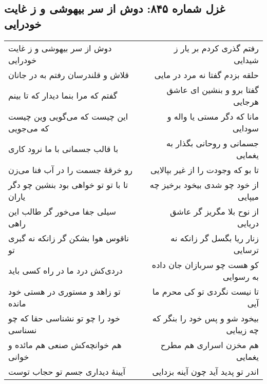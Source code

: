 \begin{center}
\section*{غزل شماره ۸۴۵: دوش از سر بیهوشی و ز غایت خودرایی}
\label{sec:845}
\begin{longtable}{l p{0.5cm} r}
دوش از سر بیهوشی و ز غایت خودرایی
&&
رفتم گذری کردم بر یار ز شیدایی
\\
قلاش و قلندرسان رفتم به در جانان
&&
حلقه بزدم گفتا نه مرد در مایی
\\
گفتم که مرا بنما دیدار که تا بینم
&&
گفتا برو و بنشین ای عاشق هرجایی
\\
این چیست که می‌گویی وین چیست که می‌جویی
&&
مانا که دگر مستی یا واله و سودایی
\\
با قالب جسمانی با ما نرود کاری
&&
جسمانی و روحانی بگذار به یغمایی
\\
رو خرقهٔ جسمت را در آب فنا می‌زن
&&
تا بو که وجودت را از غیر بپالایی
\\
تا با تو تو خواهی بود بنشین چو دگر یاران
&&
از خود چو شدی بیخود برخیز چه میپایی
\\
سیلی جفا می‌خور گر طالب این راهی
&&
از نوح بلا مگریز گر عاشق دریایی
\\
ناقوس هوا بشکن گر زانکه نه گبری تو
&&
زنار ریا بگسل گر زانکه نه ترسایی
\\
دردی‌کش درد ما در راه کسی باید
&&
کو هست چو سربازان جان داده به رسوایی
\\
تو زاهد و مستوری در هستی خود مانده
&&
تا نیست نگردی تو کی محرم ما آیی
\\
خود را چو تو نشناسی حقا که چو نسناسی
&&
بیخود شو و پس خود را بنگر که چه زیبایی
\\
هم خوانچه‌کش صنعی هم مائده و خوانی
&&
هم مخزن اسراری هم مطرح یغمایی
\\
آیینهٔ دیداری جسم تو حجاب توست
&&
اندر تو پدید آید چون آینه بزدایی
\\
\end{longtable}
\end{center}
